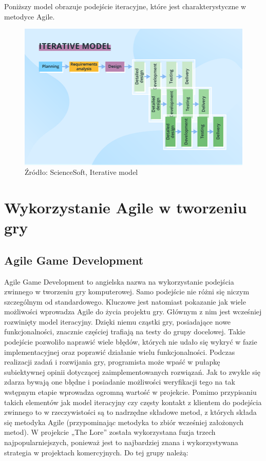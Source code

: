 \documentclass[oneside,polski,logo]{amuthesis}
\begin{document}
Poniższy model obrazuje podejście iteracyjne, które jest charakterystyczne w metodyce Agile. \\

\begin{figure}[h]
	\centering
	\includegraphics[width=15cm]{images/hyps/iterative-model.png}
	\caption{Źródło: ScienceSoft, Iterative model}
\end{figure}

\section{Wykorzystanie Agile w tworzeniu gry}
\subsection{Agile Game Development}
Agile Game Development to angielska nazwa na wykorzystanie podejścia zwinnego w tworzeniu gry komputerowej. Samo podejście nie różni się niczym szczególnym od standardowego. Kluczowe jest natomiast pokazanie jak wiele możliwości wprowadza Agile do życia projektu gry. Głównym z nim jest wcześniej rozwinięty model iteracyjny. Dzięki niemu cząstki gry, posiadające nowe funkcjonalności, znacznie częściej trafiają na testy do grupy docelowej. Takie podejście pozwoliło naprawić wiele błędów, których nie udało się wykryć w fazie implementacyjnej oraz poprawić działanie wielu funkcjonalności. Podczas realizacji zadań i rozwijania gry, programista może wpaść w pułapkę subiektywnej opinii dotyczącej zaimplementowanych rozwiązań. Jak to zwykle się zdarza bywają one błędne i posiadanie możliwości weryfikacji tego na tak wstępnym etapie wprowadza ogromną wartość w projekcie. Pomimo przypisaniu takich elementów jak model iteracyjny czy częsty kontakt z klientem do podejścia zwinnego to w rzeczywistości są to nadrzędne składowe metod, z których składa się metodyka Agile (przypominając metodyka to zbiór wcześniej założonych metod). W projekcie „The Lore” została wykorzystana fuzja trzech najpopularniejszych, ponieważ jest to najbardziej znana i wykorzystywana strategia w projektach komercyjnych.\cite{Agile game} Do tej grupy należą:\\
\end{document}

